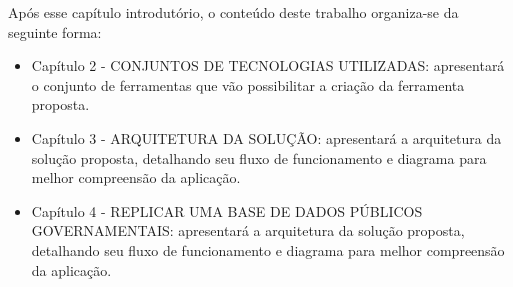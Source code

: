 Após esse capítulo introdutório, o conteúdo deste trabalho organiza-se da seguinte forma:
	\begin{itemize}
		\item{Capítulo 2 - \uppercase{Conjuntos de tecnologias utilizadas}: apresentará o conjunto de ferramentas que vão possibilitar a criação da ferramenta proposta.}
		\item{Capítulo 3 - \uppercase{Arquitetura da solução}: apresentará a arquitetura da solução proposta, detalhando seu fluxo de funcionamento e diagrama para melhor compreensão da aplicação.}
		\item{Capítulo 4 - \uppercase{Replicar uma base de dados públicos governamentais}: apresentará a arquitetura da solução proposta, detalhando seu fluxo de funcionamento e diagrama para melhor compreensão da aplicação.}
	\end{itemize}
